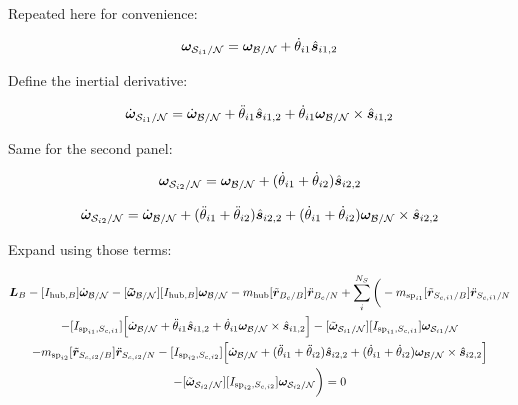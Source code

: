 \documentclass[paper]{aiaaNew}
\begin{document}
Repeated here for convenience:

\begin{equation}
\bm \omega_{\mathcal{S}_{i1}/\mathcal{N}} = \bm \omega_{\cal{B/N}} + \dot{\theta}_{i1} \hat{\bm s}_{i1,2}
\end{equation}

Define the inertial derivative:

\begin{equation}
\dot{\bm \omega}_{\mathcal{S}_{i1}/\mathcal{N}} = \dot{\bm \omega}_{\cal{B/N}} + \ddot{\theta}_{i1} \hat{\bm s}_{i1,2} + \dot{\theta}_{i1} \bm \omega_{\cal{B/N}} \times \hat{\bm s}_{i1,2}
\end{equation}

Same for the second panel:

\begin{equation}
\bm \omega_{\mathcal{S}_{i2}/\mathcal{N}} = \bm \omega_{\cal{B/N}} + (\dot{\theta}_{i1}  + \dot{\theta}_{i2})\hat{\bm s}_{i2,2}
\end{equation}

\begin{equation}
\dot{\bm \omega}_{\mathcal{S}_{i2}/\mathcal{N}} = \dot{\bm \omega}_{\cal{B/N}} + (\ddot{\theta}_{i1}  + \ddot{\theta}_{i2})\hat{\bm s}_{i2,2} + (\dot{\theta}_{i1}  + \dot{\theta}_{i2}) \bm \omega_{\cal{B/N}} \times \hat{\bm s}_{i2,2}
\end{equation}

Expand using those terms:

\begin{multline}
\bm L_B -[I_{\text{hub},B}] \dot{\bm\omega}_{\cal B/N}  -[\bm{\tilde{\omega}}_{\cal B/N}] [I_{\text{hub},B}] \bm\omega_{\cal B/N} - m_{\text{hub}} [\tilde{{\bm r}}_{B_c/B}] \ddot{\bm r}_{B_c/N} 
+ \sum\limits_{i}^{N_S}\bigg(- m_{\text{sp}_{i1}} [\tilde{{\bm r}}_{S_{c,i1}/B}] \ddot{\bm r}_{S_{c,i1}/N} \\
-[I_{\text{sp}_{i1},S_{c,i1}}] \Big[\dot{\bm \omega}_{\cal{B/N}} + \ddot{\theta}_{i1} \hat{\bm s}_{i1,2} + \dot{\theta}_{i1} \bm \omega_{\cal{B/N}} \times \hat{\bm s}_{i1,2}\Big]  -[\tilde{\bm \omega}_{\mathcal{S}_{i1}/\mathcal{N}}] [I_{\text{sp}_{i1},S_{c,i1}}] \bm \omega_{\mathcal{S}_{i1}/\mathcal{N}}\\
- m_{\text{sp}_{i2}} [\tilde{{\bm r}}_{S_{c,i2}/B}] \ddot{\bm r}_{S_{c,i2}/N} -[I_{\text{sp}_{i2},S_{c,i2}}] \Big[\dot{\bm \omega}_{\cal{B/N}} + (\ddot{\theta}_{i1}  + \ddot{\theta}_{i2})\hat{\bm s}_{i2,2} + (\dot{\theta}_{i1}  + \dot{\theta}_{i2}) \bm \omega_{\cal{B/N}} \times \hat{\bm s}_{i2,2}\Big]  \\
-[\tilde{\bm \omega}_{\mathcal{S}_{i2}/\mathcal{N}}] [I_{\text{sp}_{i2},S_{c,i2}}] \bm \omega_{\mathcal{S}_{i2}/\mathcal{N}}\bigg) = 0
\end{multline}
\end{document}
